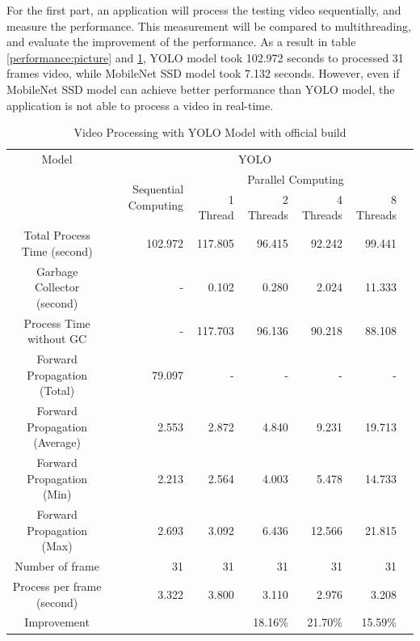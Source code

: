             For the first part, an application will process the testing video sequentially, and measure the performance.
            This measurement will be compared to multithreading, and evaluate the improvement of the performance.
            As a result in table \ref{performance:picture} and \ref{yolo:official-performace},
            YOLO model took 102.972 seconds to processed 31 frames video, while MobileNet SSD model took 7.132 seconds.
            However, even if MobileNet SSD model can achieve better performance than YOLO model,
            the application is not able to process a video in real-time.

            \begin{table}[!htp]\centering
                \scriptsize
                \begin{tabular}{lrrrrrrr}\toprule
                    \multicolumn{2}{c}{Model} &\multicolumn{5}{c}{YOLO} \\\cmidrule{1-7}
                    \multicolumn{2}{c}{\multirow{2}{*}{}} &\multirow{2}{*}{Sequential Computing} &\multicolumn{4}{c}{Parallel Computing} \\\cmidrule{4-7}
                    & & &1 Thread &2 Threads &4 Threads &8 Threads \\\midrule
                    \multicolumn{2}{c}{Total Process Time (second)} &102.972 &117.805 &96.415 &92.242 &99.441 \\
                    \multicolumn{2}{c}{Garbage Collector (second)} &- &0.102 &0.280 &2.024 &11.333 \\
                    \multicolumn{2}{c}{Process Time without GC} &- &117.703 &96.136 &90.218 &88.108 \\
                    \multicolumn{2}{c}{Forward Propagation (Total)} &79.097 &- &- &- &- \\
                    \multicolumn{2}{c}{Forward Propagation (Average)} &2.553 &2.872 &4.840 &9.231 &19.713 \\
                    \multicolumn{2}{c}{Forward Propagation (Min)} &2.213 &2.564 &4.003 &5.478 &14.733 \\
                    \multicolumn{2}{c}{Forward Propagation (Max)} &2.693 &3.092 &6.436 &12.566 &21.815 \\
                    \multicolumn{2}{c}{Number of frame} &31 &31 &31 &31 &31 \\
                    \multicolumn{2}{c}{Process per frame (second)} &3.322 &3.800 &3.110 &2.976 &3.208 \\
                    \multicolumn{2}{c}{Improvement} & & &18.16\% &21.70\% &15.59\% \\
                    \bottomrule
                \end{tabular}

                \caption{Video Processing with YOLO Model with official build}\label{yolo:official-performace}
            \end{table}

